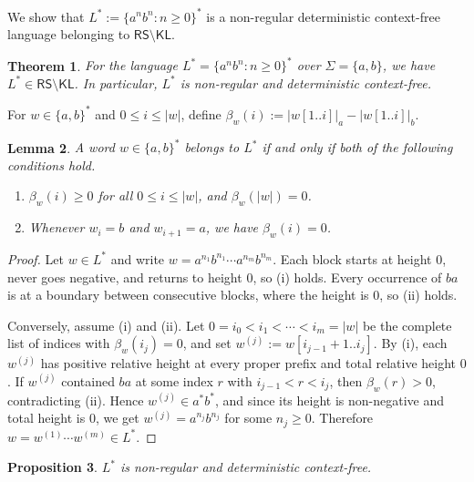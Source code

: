 \documentclass[11pt,a4paper]{article}
\newtheorem{theorem}{Theorem}[section]
\newtheorem{lemma}[theorem]{Lemma}
\newtheorem{proposition}[theorem]{Proposition}
\begin{document}
We show that $L^*:=\{a^nb^n:n\ge 0\}^*$ is a non-regular
deterministic context-free language belonging to
$\mathsf{RS}\setminus\mathsf{KL}$.

\begin{theorem}\label{thm:lstar-rs-not-kl}
For the language $L^*=\{a^nb^n:n\ge 0\}^*$ over $\Sigma=\{a,b\}$,
we have $L^*\in\mathsf{RS}\setminus\mathsf{KL}$.
In particular, $L^*$ is non-regular and deterministic context-free.
\end{theorem}

For $w\in\{a,b\}^*$ and $0\le i\le|w|$, define
$\beta_w(i):=|w[1..i]|_a-|w[1..i]|_b$.

\medskip
\begin{lemma}\label{lem:lstar-char}
A word $w\in\{a,b\}^*$ belongs to $L^*$ if and only if both of the
following conditions hold.
\begin{enumerate}[label=\textup{(\roman*)},nosep]
\item $\beta_w(i)\ge 0$ for all $0\le i\le|w|$, and $\beta_w(|w|)=0$.
\item Whenever $w_i=b$ and $w_{i+1}=a$, we have $\beta_w(i)=0$.
\end{enumerate}
\end{lemma}

\begin{proof}
Let $w\in L^*$ and write $w=a^{n_1}b^{n_1}\cdots a^{n_m}b^{n_m}$.
Each block starts at height $0$, never goes negative, and returns to
height $0$, so \textup{(i)} holds.
Every occurrence of $ba$ is at a boundary between consecutive blocks,
where the height is $0$, so \textup{(ii)} holds.

Conversely, assume \textup{(i)} and \textup{(ii)}.
Let $0=i_0<i_1<\cdots<i_m=|w|$ be the complete list of indices with
$\beta_w(i_j)=0$, and set $w^{(j)}:=w[i_{j-1}+1..i_j]$.
By \textup{(i)}, each $w^{(j)}$ has positive relative height at every
proper prefix and total relative height $0$.
If $w^{(j)}$ contained $ba$ at some index $r$ with $i_{j-1}<r<i_j$,
then $\beta_w(r)>0$, contradicting \textup{(ii)}.
Hence $w^{(j)}\in a^*b^*$, and since its height is non-negative and
total height is $0$, we get $w^{(j)}=a^{n_j}b^{n_j}$ for some
$n_j\ge 0$.
Therefore $w=w^{(1)}\cdots w^{(m)}\in L^*$.
\end{proof}

\begin{proposition}\label{prop:lstar-basic}
$L^*$ is non-regular and deterministic context-free.
\end{proposition}
\end{document}

